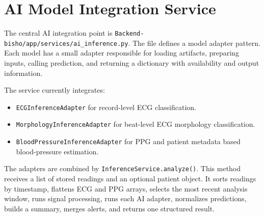 \section{AI Model Integration Service}

The central AI integration point is \texttt{Backend-bisho/app/services/ai\_inference.py}. The file defines a model adapter pattern. Each model has a small adapter responsible for loading artifacts, preparing inputs, calling prediction, and returning a dictionary with availability and output information.

The service currently integrates:

\begin{itemize}
    \item \texttt{ECGInferenceAdapter} for record-level ECG classification.
    \item \texttt{MorphologyInferenceAdapter} for beat-level ECG morphology classification.
    \item \texttt{BloodPressureInferenceAdapter} for PPG and patient metadata based blood-pressure estimation.
\end{itemize}

The adapters are combined by \texttt{InferenceService.analyze()}. This method receives a list of stored readings and an optional patient object. It sorts readings by timestamp, flattens ECG and PPG arrays, selects the most recent analysis window, runs signal processing, runs each AI adapter, normalizes predictions, builds a summary, merges alerts, and returns one structured result.

